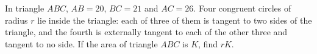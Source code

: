 In triangle $ABC$, $AB=20$, $BC=21$ and $AC=26$. Four congruent circles of radius $r$ lie inside the triangle: each of three of them is tangent to two sides of the triangle, and the fourth is externally tangent to each of the other three and tangent to no side. If the area of triangle $ABC$ is $K$, find $rK$.

